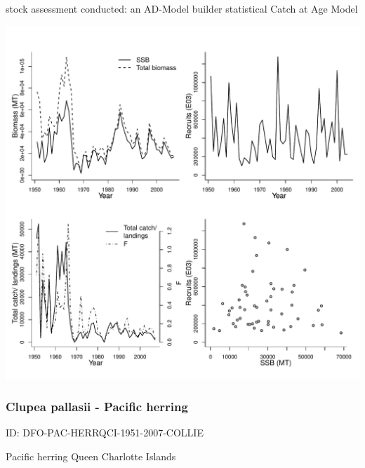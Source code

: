 stock assessment conducted: an AD-Model builder statistical Catch at Age Model 
\begin{center}
\vspace{-0.2cm}\includegraphics[scale=0.65]{../tex/figures/plot-DFO-PAC-HERRPRD-1951-2007-COLLIE.pdf}
\end{center}

\newpage
\subsubsection{Clupea pallasii - Pacific herring}
ID: DFO-PAC-HERRQCI-1951-2007-COLLIE

Pacific herring Queen Charlotte Islands 

